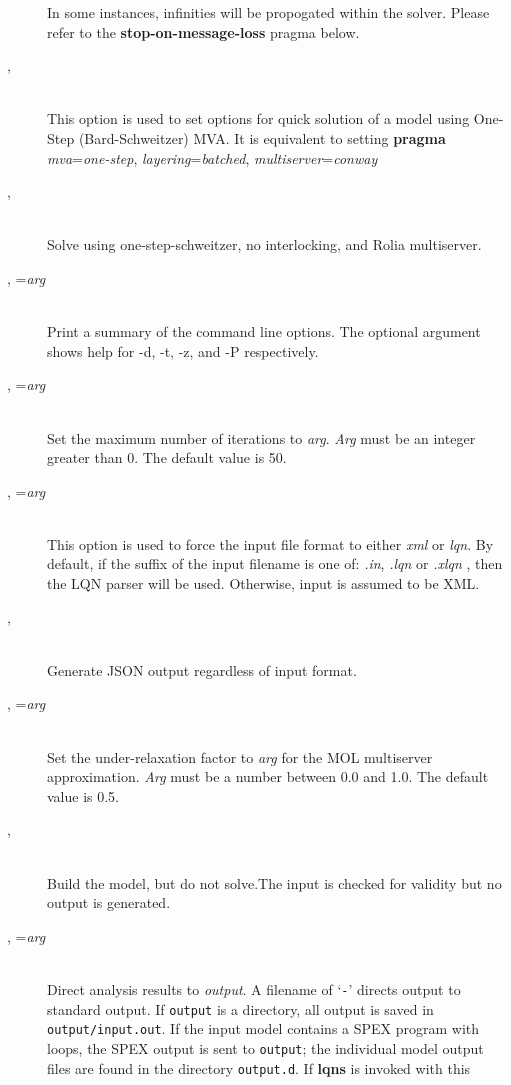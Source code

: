 \begin{description}
In some instances, infinities  will be propogated within the solver.  Please refer to the
\textbf{stop-on-message-loss} pragma below.
\item[\flag{f}{}, \longopt{fast-linearizer}]~\\
This option is used to set options for quick solution of a model using One-Step (Bard-Schweitzer) MVA.
It is equivalent to setting \textbf{pragma} \emph{mva}=\emph{one-step}, \emph{layering}=\emph{batched}, \emph{multiserver}=\emph{conway}
\item[\flag{h}{}, \longopt{huge}]~\\
Solve using one-step-schweitzer, no interlocking, and Rolia multiserver.
\item[\flag{H}{}, \longopt{help}=\emph{arg}]~\\
Print a summary of the command line options.  The optional argument shows help for -d, -t, -z, and -P respectively.
\item[\flag{i}{}, \longopt{iteration-limit}=\emph{arg}]~\\
Set the maximum number of iterations to \emph{arg}.
\emph{Arg} must be an integer greater than 0.  The default value is 50.
\item[\flag{I}{}, \longopt{input-format}=\emph{arg}]~\\
This option is used to force the input file format to either \emph{xml} or \emph{lqn}.
By default, if the suffix of the input filename is one of: \emph{.in}, \emph{.lqn} or \emph{.xlqn}
, then the LQN parser will be used.  Otherwise, input is assumed to be XML.
\item[\flag{j}{}, \longopt{json}]~\\
Generate JSON output regardless of input format.
\item[\flag{M}{}, \longopt{mol-underrelaxation}=\emph{arg}]~\\
Set the under-relaxation factor to \emph{arg} for the MOL multiserver approximation.
\emph{Arg} must be a number between 0.0 and 1.0.
The default value is 0.5.
\item[\flag{n}{}, \longopt{no-execute}]~\\
Build the model, but do not solve.The input is checked for validity but no output is generated.
\item[\flag{o}{}, \longopt{output}=\emph{arg}]~\\
Direct analysis results to \emph{output}.  A filename of `\texttt{-}'
directs output to standard output.  If \texttt{output} is a directory, all output is saved in \texttt{output/input.out}. If the input model contains a SPEX program with loops, the SPEX output is sent to \texttt{output}; the individual model output files are found in the directory \texttt{output.d}. If \textbf{lqns} is invoked with this

\end{description}
